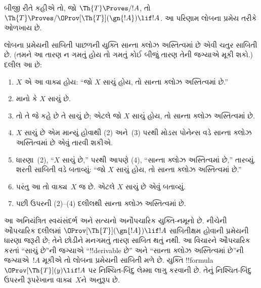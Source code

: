 \documentclass[../../../include/open-logic-section]{subfiles}
\begin{document}
બીજી રીતે કહીએ તો, જો $\Th{T} \Proves/ !A$, તો $\Th{T} \Proves/ \OProv[\Th{T}](\gn{!A}) \lif !A$. આ પરિણામ લોબના પ્રમેય તરીકે ઓળખાય છે.

\begin{explain}
લોબના પ્રમેયની સાબિતી પાછળની યુક્તિ સાન્તા ક્લોઝ અસ્તિત્વમાં છે એવી ચતુર સાબિતી છે. (તમને આ તારણ ન ગમતું હોય તો ગમતું કોઈ બીજું તારણ તેની જગ્યાએ મૂકી શકો.) દલીલ આ છે:
\begin{enumerate}
\item $X$ એ આ વાક્ય હોય: ``જો $X$ સાચું હોય, તો સાન્તા ક્લોઝ અસ્તિત્વમાં છે.''
\item માનો કે $X$ સાચું છે.
\item તો તે જે કહે છે તે સાચું છે; એટલે જો $X$ સાચું હોય, તો સાન્તા ક્લોઝ અસ્તિત્વમાં છે.
\item $X$ સાચું છે એમ માન્યું હોવાથી (2) અને~(3) પરથી મોડસ પોનેન્સ વડે સાન્તા ક્લોઝ અસ્તિત્વમાં છે એવું તારવી શકીએ.
\item ધારણા~(2), ``$X$ સાચું છે,'' પરથી આપણે (4), ``સાન્તા ક્લોઝ અસ્તિત્વમાં છે,'' તારવ્યું. શરતી સાબિતી વડે બતાવ્યું: ``જો $X$ સાચું હોય, તો સાન્તા ક્લોઝ અસ્તિત્વમાં છે.''
\item પરંતુ આ તો વાક્ય~$X$ જ છે. એટલે $X$ સાચું છે એવું બતાવ્યું.
\item પછી ઉપરની (2)--(4) દલીલથી સાન્તા ક્લોઝ અસ્તિત્વમાં છે.
\end{enumerate}
આ અનિયંત્રિત સ્વયંસંદર્ભ અને સત્યનો અનૌપચારિક
યુક્તિ-નમૂનો છે. નીચેની ઔપચારિક દલીલમાં
$\OProv[\Th{T}](\gn{!A})\lif !A$ સાબિતીક્ષમ હોવાની
પ્રમેયની ધારણા જરૂરી છે; તેને છોડીને મનગમતું
તારણ સાબિત થતું નથી.
આ વિચારને ઔપચારિક કરતાં ``સાચું છે''ની જગ્યાએ ``!!{derivable} છે'' અને ``સાન્તા ક્લોઝ અસ્તિત્વમાં છે''ની જગ્યાએ~$!A$ મૂકીએ તો લોબના પ્રમેયની સાબિતી મળે છે. યુક્તિ !!{formula}~$\OProv[\Th{T}](y) \lif !A$ પર નિશ્ચિત-બિંદુ લેમ્મા લાગુ કરવાની છે. તેનું નિશ્ચિત-બિંદુ ઉપરની રૂપરેખાના વાક્ય~$X$ને અનુરૂપ છે.
\end{explain}
\end{document}
